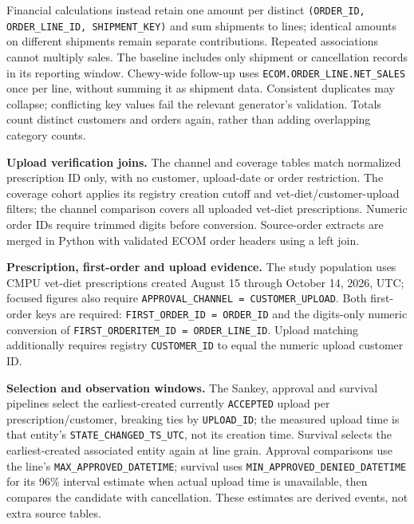 Financial calculations instead retain one amount per distinct
\texttt{(ORDER\_ID, ORDER\_LINE\_ID, SHIPMENT\_KEY)} and sum shipments to lines;
identical amounts on different shipments remain separate contributions.
Repeated associations cannot multiply sales. The baseline includes only shipment
or cancellation records in its reporting window. Chewy-wide follow-up uses
\texttt{ECOM.ORDER\_LINE.NET\_SALES} once per line, without summing it as
shipment data. Consistent duplicates may collapse; conflicting key values fail
the relevant generator's validation. Totals count distinct customers and orders
again, rather than adding overlapping category counts.

\clearpage
\noindent\textbf{Upload verification joins.}
The channel and coverage tables match normalized prescription ID only, with no
customer, upload-date or order restriction. The coverage cohort applies its
registry creation cutoff and vet-diet/customer-upload filters; the channel
comparison covers all uploaded vet-diet prescriptions. Numeric order IDs require
trimmed digits before conversion. Source-order extracts are merged in Python
with validated ECOM order headers using a left join.



\clearpage
\noindent\textbf{Prescription, first-order and upload evidence.}
The study population uses CMPU vet-diet prescriptions created August 15 through
October 14, 2026, UTC; focused figures also require
\texttt{APPROVAL\_CHANNEL = CUSTOMER\_UPLOAD}. Both first-order keys are required:
\texttt{FIRST\_ORDER\_ID = ORDER\_ID} and the digits-only numeric conversion of
\texttt{FIRST\_ORDERITEM\_ID = ORDER\_LINE\_ID}. Upload matching additionally
requires registry \texttt{CUSTOMER\_ID} to equal the numeric upload customer ID.



\clearpage
\noindent\textbf{Selection and observation windows.}
The Sankey, approval and survival pipelines select the earliest-created currently
\texttt{ACCEPTED} upload per prescription/customer, breaking ties by
\texttt{UPLOAD\_ID}; the measured upload time is that entity's
\texttt{STATE\_CHANGED\_TS\_UTC}, not its creation time. Survival selects the
earliest-created associated entity again at line grain. Approval comparisons use
the line's \texttt{MAX\_APPROVED\_DATETIME}; survival uses
\texttt{MIN\_APPROVED\_DENIED\_DATETIME} for its 96\% interval estimate when actual
upload time is unavailable, then compares the candidate with cancellation.
These estimates are derived events, not extra source tables.

